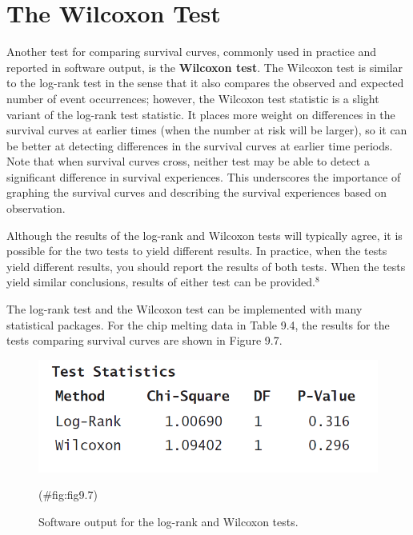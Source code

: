 \documentclass[
]{report}
\begin{document}
\section*{The Wilcoxon Test}\label{the-wilcoxon-test}

Another test for comparing survival curves, commonly used in practice and reported in software output, is the \textbf{Wilcoxon test}. The Wilcoxon test is similar to the log-rank test in the sense that it also compares the observed and expected number of event occurrences; however, the Wilcoxon test statistic is a slight variant of the log-rank test statistic. It places more weight on differences in the survival curves at earlier times (when the number at risk will be larger), so it can be better at detecting differences in the survival curves at earlier time periods. Note that when survival curves cross, neither test may be able to detect a significant difference in survival experiences. This underscores the importance of graphing the survival curves and describing the survival experiences based on observation.

Although the results of the log-rank and Wilcoxon tests will typically agree, it is possible for the two tests to yield different results. In practice, when the tests yield different results, you should report the results of both tests. When the tests yield similar conclusions, results of either test can be provided.\(^8\)

The log-rank test and the Wilcoxon test can be implemented with many statistical packages. For the chip melting data in Table 9.4, the results for the tests comparing survival curves are shown in Figure 9.7.

\begin{figure}

{\centering \includegraphics[width=1\linewidth]{docs/Fig9_7} 

}

\caption{Software output for the log-rank and Wilcoxon tests.}(\#fig:fig9.7)
\end{figure}
\end{document}
